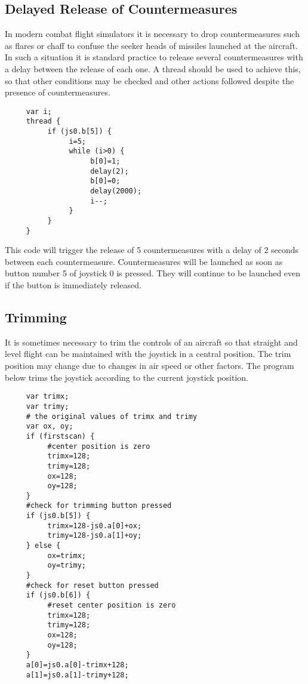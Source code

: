 \documentclass{article}
\begin{document}
\subsection{Delayed Release of Countermeasures}
In modern combat flight simulators it is necessary to 
drop countermeasures such as flares or chaff to confuse
the seeker heads of missiles launched at the aircraft.
In such a situation it is standard practice to
release several countermeasures with a delay between
the release of each one. A thread should be used to
achieve this, so that other conditions may be checked
and other actions followed despite the presence
of countermeasures.
\begin{verbatim}
     var i;
     thread {
          if (js0.b[5]) {
               i=5;
               while (i>0) {
                    b[0]=1;
                    delay(2);
                    b[0]=0;
                    delay(2000);
                    i--;
               }
          }
     }
\end{verbatim}
This code will trigger the release of 5 countermeasures 
with a delay of 2 seconds between each countermeasure. Countermeasures
will be launched as soon as button number 5 of joystick 0
is pressed. They will continue to be launched even if the
button is immediately released.

\subsection{Trimming}
It is sometimes necessary to trim the controls of an aircraft
so that straight and level flight can be maintained with
the joystick in a central position. The trim position may
change due to changes in air speed or other factors.
The program below trims the joystick according to the current
joystick position.
\begin{verbatim}
     var trimx;
     var trimy;
     # the original values of trimx and trimy
     var ox, oy;
     if (firstscan) {
          #center position is zero
          trimx=128;
          trimy=128;
          ox=128;
          oy=128;
     }
     #check for trimming button pressed
     if (js0.b[5]) {
          trimx=128-js0.a[0]+ox;
          trimy=128-js0.a[1]+oy;
     } else {
          ox=trimx;
          oy=trimy;
     }
     #check for reset button pressed
     if (js0.b[6]) {
          #reset center position is zero
          trimx=128;
          trimy=128;
          ox=128;
          oy=128;
     } 
     a[0]=js0.a[0]-trimx+128;
     a[1]=js0.a[1]-trimy+128;
\end{verbatim}
\end{document}
